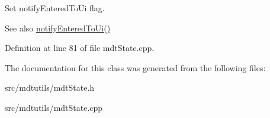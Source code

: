 Set notifyEnteredToUi flag. 

\begin{DoxySeeAlso}{See also}
\hyperlink{classmdt_state_a8097cd281438cc58b39b9a195076d841}{notifyEnteredToUi()} 
\end{DoxySeeAlso}


Definition at line 81 of file mdtState.cpp.



The documentation for this class was generated from the following files:\begin{DoxyCompactItemize}
\item 
src/mdtutils/mdtState.h\item 
src/mdtutils/mdtState.cpp\end{DoxyCompactItemize}
